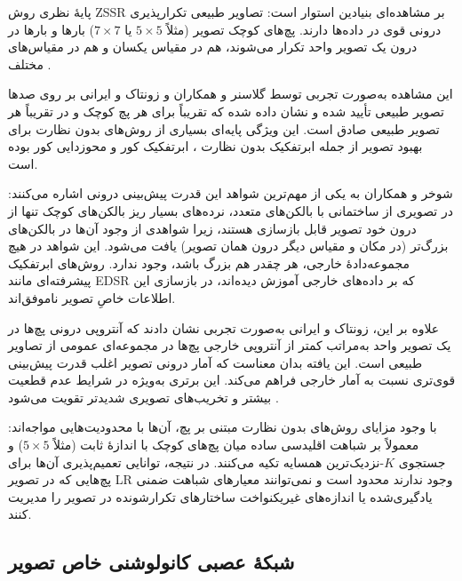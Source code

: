 پایهٔ نظری روش ZSSR بر مشاهده‌ای بنیادین استوار است: تصاویر طبیعی
تکرارپذیری درونی قوی در داده‌ها دارند. پچ‌های کوچک تصویر (مثلاً
$5\times5$ یا $7\times7$) بارها و بارها در درون یک تصویر واحد تکرار
می‌شوند، هم در مقیاس یکسان و هم در مقیاس‌های مختلف
\cite{glasner2009sr, zontak2011internal}.

این مشاهده به‌صورت تجربی توسط گلاسنر و همکاران
\cite{glasner2009sr} و زونتاک و ایرانی \cite{zontak2011internal}
بر روی صدها تصویر طبیعی تأیید شده و نشان داده شده که تقریباً برای
هر پچ کوچک و در تقریباً هر تصویر طبیعی صادق است. این ویژگی پایه‌ای
بسیاری از روش‌های بدون نظارت برای بهبود تصویر از جمله ابرتفکیک بدون
نظارت \cite{glasner2009sr, freedman2011selfexamples, huang2015selfex}،
ابرتفکیک کور \cite{michaeli2013blind} و محو‌زدایی کور
\cite{michaeli2014deblur, bahat2017deblur} بوده است.

شوخر و همکاران به یکی از مهم‌ترین شواهد این قدرت پیش‌بینی درونی اشاره
می‌کنند: در تصویری از ساختمانی با بالکن‌های متعدد، نرده‌های بسیار
ریز بالکن‌های کوچک تنها از درون خود تصویر قابل بازسازی هستند، زیرا
شواهدی از وجود آن‌ها در بالکن‌های بزرگ‌تر (در مکان و مقیاس دیگر درون
همان تصویر) یافت می‌شود. این شواهد در هیچ مجموعه‌دادهٔ خارجی، هر چقدر
هم بزرگ باشد، وجود ندارد. روش‌های ابرتفکیک پیشرفته‌ای مانند
EDSR \cite{lim2017edsr} که بر داده‌های خارجی آموزش دیده‌اند، در
بازسازی این اطلاعات خاصِ تصویر ناموفق‌اند.

علاوه بر این، زونتاک و ایرانی \cite{zontak2011internal} به‌صورت
تجربی نشان دادند که آنتروپی درونی پچ‌ها در یک تصویر واحد
به‌مراتب کمتر از آنتروپی خارجی پچ‌ها در مجموعه‌ای عمومی از
تصاویر طبیعی است. این یافته بدان معناست که آمار درونی تصویر
اغلب قدرت پیش‌بینی قوی‌تری نسبت به آمار خارجی فراهم می‌کند.
این برتری به‌ویژه در شرایط عدم قطعیت بیشتر و تخریب‌های تصویری
شدیدتر تقویت می‌شود \cite{zontak2011internal, mosseri2013combining}.

با وجود مزایای روش‌های بدون نظارت مبتنی بر پچ، آن‌ها با محدودیت‌هایی
مواجه‌اند: معمولاً بر شباهت اقلیدسی ساده میان پچ‌های کوچک با
اندازهٔ ثابت (مثلاً $5\times5$) و جستجوی $K$-نزدیک‌ترین همسایه
تکیه می‌کنند. در نتیجه، توانایی تعمیم‌پذیری آن‌ها برای پچ‌هایی که در
تصویر LR وجود ندارند محدود است و نمی‌توانند معیارهای شباهت ضمنی
یادگیری‌شده یا اندازه‌های غیریکنواخت ساختارهای تکرارشونده در تصویر
را مدیریت کنند.

\subsection{شبکهٔ عصبی کانولوشنی خاص تصویر}
\label{subsec:image_specific_cnn}

